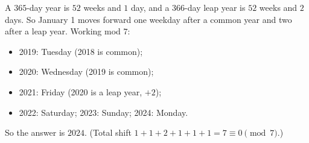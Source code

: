A $365$-day year is $52$ weeks and $1$ day, and a $366$-day leap year is $52$ weeks and $2$ days. So January 1 moves forward one weekday after a common year and two after a leap year. Working mod $7$:
\begin{itemize}
\item 2019: Tuesday (2018 is common);
\item 2020: Wednesday (2019 is common);
\item 2021: Friday (2020 is a leap year, $+2$);
\item 2022: Saturday; 2023: Sunday; 2024: Monday.
\end{itemize}
So the answer is $\boxed{2024}$. (Total shift $1+1+2+1+1+1=7\equiv0\pmod7$.)
